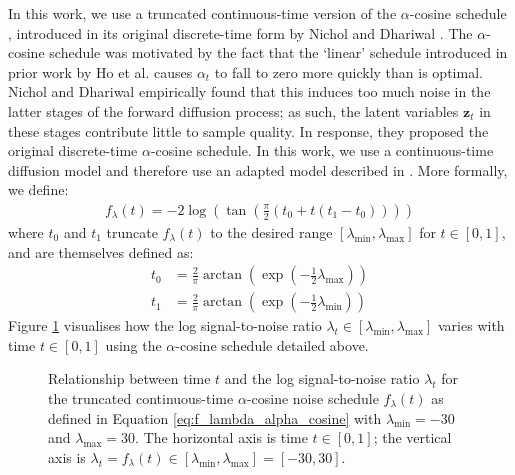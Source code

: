\documentclass[ oneside,%
                    author={George Herbert},
                    degree={MSci},
                     title={Video Diffusion Models for Climate Simulations},
                  subtitle={}]{dissertation}
\begin{document}
In this work, we use a truncated continuous-time version of the $\alpha$-cosine schedule \cite{IDDPM_Nichol}, introduced in its original discrete-time form by Nichol and Dhariwal \cite{IDDPM_Nichol}. The $\alpha$-cosine schedule was motivated by the fact that the `linear' schedule introduced in prior work by Ho et al. \cite{DDPM_Ho} causes $\alpha_t$ to fall to zero more quickly than is optimal. Nichol and Dhariwal empirically found that this induces too much noise in the latter stages of the forward diffusion process; as such, the latent variables $\mathbf{z}_t$ in these stages contribute little to sample quality. In response, they proposed the original discrete-time $\alpha$-cosine schedule. In this work, we use a continuous-time diffusion model and therefore use an adapted model described in \cite{Simple_Diffusion_Hoogeboom}. More formally, we define:
\begin{align}
      f_{\lambda}(t)=-2\log\left(\tan\left(\frac{\pi}{2}(t_0+t(t_1-t_0))\right)\right)
      \label{eq:f_lambda_alpha_cosine}
\end{align} 
where $t_0$ and $t_1$ truncate $f_{\lambda}(t)$ to the desired range $[\lambda_{\min}, \lambda_{\max}]$ for $t\in[0,1]$, and are themselves defined as:
\begin{align}
      t_0&=\frac{2}{\pi}\arctan\left(\exp\left(-\frac{1}{2}\lambda_{\max}\right)\right)\\
      t_1&=\frac{2}{\pi}\arctan\left(\exp\left(-\frac{1}{2}\lambda_{\min}\right)\right)
\end{align}
Figure \ref{fig:cosine_lambda_t} visualises how the log signal-to-noise ratio $\lambda_t\in[\lambda_{\min},\lambda_{\max}]$ varies with time $t\in[0,1]$ using the $\alpha$-cosine schedule detailed above.

\begin{figure}[htbp]
      \centering
      \caption{Relationship between time $t$ and the log signal-to-noise ratio $\lambda_t$ for the truncated continuous-time $\alpha$-cosine noise schedule $f_\lambda(t)$ as defined in Equation \ref{eq:f_lambda_alpha_cosine} with $\lambda_{\min}=-30$ and $\lambda_{\max}=30$. The horizontal axis is time $t\in[0,1]$; the vertical axis is $\lambda_t=f_\lambda(t)\in[\lambda_{\min},\lambda_{\max}]=[-30, 30]$.}
      \label{fig:cosine_lambda_t}
\end{figure}
\end{document}
